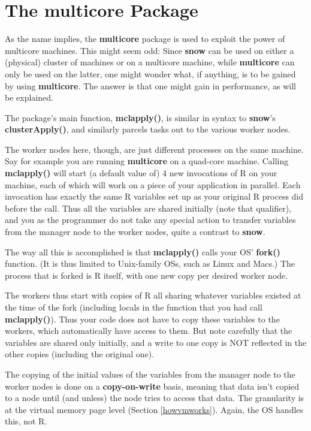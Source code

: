 \section{The multicore Package}

As the name implies, the {\bf multicore} package is used to exploit the
power of multicore machines.  This might seem odd: Since {\bf snow} can
be used on either a (physical) cluster of machines or on a multicore
machine, while {\bf multicore} can only be used on the latter, one might
wonder what, if anything, is to be gained by using {\bf multicore}.  The
answer is that one might gain in performance, as will be explained.

The package's main function, {\bf mclapply()}, is similar in syntax to
{\bf snow}'s {\bf clusterApply()}, and similarly parcels tasks out to
the various worker nodes.  

The worker nodes here, though, are just different processes on the same
machine.  Say for example you are running {\bf multicore} on a quad-core
machine.  Calling {\bf mclapply()} will start (a default value of) 4 new
invocations of R on your machine, each of which will work on a piece of
your application in parallel.  Each invocation has exactly the same R
variables set up as your original R process did before the call.  Thus
all the variables are shared initially (note that qualifier), and you as
the programmer do not take any special action to transfer variables from
the manager node to the worker nodes, quite a contrast to {\bf snow}.

The way all this is accomplished is that {\bf mclapply()} calls your OS'
{\bf fork()} function.  (It is thus limited to Unix-family OSs, such as
Linux and Macs.)  The process that is forked is R itself, with one new
copy per desired worker node.  

The workers thus start with copies of R all sharing whatever variables
existed at the time of the fork (including locals in the function that
you had call {\bf mclapply()}).  Thus your code does not have to copy
these variables to the workers, which automatically have access to them.
But note carefully that the variables are shared only initially, and a
write to one copy is NOT reflected in the other copies (including the
original one).  

The copying of the initial values of the variables from the manager node
to the worker nodes is done on a {\bf copy-on-write} basis, meaning that
data isn't copied to a node until (and unless) the node tries to access
that data.  The granularity is at the virtual memory page level (Section
\ref{howvmworks}).  Again, the OS handles this, not R.

